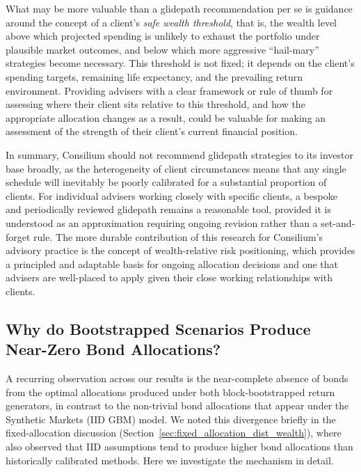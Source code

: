 \documentclass[11pt]{article}
\begin{document}
\begin{asidebox}
What may be more valuable than a glidepath recommendation per se is guidance around the concept of a client's \textit{safe wealth threshold}, that is, the wealth level above which projected spending is unlikely to exhaust the portfolio under plausible market outcomes, and below which more aggressive ``hail-mary'' strategies become necessary. This threshold is not fixed; it depends on the client's spending targets, remaining life expectancy, and the prevailing return environment. Providing advisers with a clear framework or rule of thumb for assessing where their client sits relative to this threshold, and how the appropriate allocation changes as a result, could be valuable for making an assessment of the strength of their client's current financial position.

In summary, Consilium should not recommend glidepath strategies to its investor base broadly, as the heterogeneity of client circumstances means that any single schedule will inevitably be poorly calibrated for a substantial proportion of clients. For individual advisers working closely with specific clients, a bespoke and periodically reviewed glidepath remains a reasonable tool, provided it is understood as an approximation requiring ongoing revision rather than a set-and-forget rule. The more durable contribution of this research for Consilium's advisory practice is the concept of wealth-relative risk positioning, which provides a principled and adaptable basis for ongoing allocation decisions and one that advisers are well-placed to apply given their close working relationships with clients.
\end{asidebox}

\subsection{Why do Bootstrapped Scenarios Produce Near-Zero Bond Allocations?}
\label{sec:why_no_bonds}

A recurring observation across our results is the near-complete absence of bonds from the optimal allocations produced under both block-bootstrapped return generators, in contrast to the non-trivial bond allocations that appear under the Synthetic Markets (IID GBM) model. We noted this divergence briefly in the fixed-allocation discussion (Section~\ref{sec:fixed_allocation_dist_wealth}), where \textcite{anarkulova2025beyond} also observed that IID assumptions tend to produce higher bond allocations than historically calibrated methods. Here we investigate the mechanism in detail.
\end{document}

